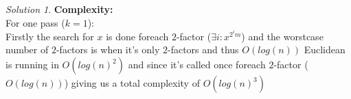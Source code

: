 \documentclass[a4paper,twoside=false,abstract=false,numbers=noenddot,
titlepage=false,headings=small,parskip=half,version=last]{scrartcl}
\theoremstyle{definition}
\theoremstyle{remark}
\newtheorem*{solution}{Solution}
\begin{document}
\begin{solution}
   {\bf Complexity: } \\
   For one pass ($k=1$):\\
   Firstly the search for $x$ is done foreach $2$-factor ($\exists i:x^{2^im}$) and the worstcase number of $2$-factors is when it's only $2$-factors and thus $O(log(n))$
   Euclidean is running in $O(log(n)^2)$ and since it's called once foreach $2$-factor ($O(log(n))$) giving us a total complexity of \underline{$O(log(n)^3)$}
   






   

\end{solution}
\end{document}
